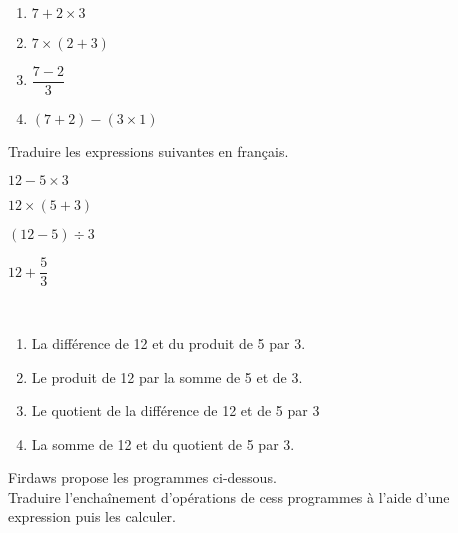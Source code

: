 \documentclass[nocrop]{sesamanuel_college_5e_new}
\begin{document}
\begin{colonne*exercice}
\begin{corrige}
   \ \\ [-5mm]
   \begin{enumerate}
      \item \blue $7+2\times3$
      \item \blue $7\times(2+3)$ \smallskip
      \item \blue $\dfrac{7-2}{3}$ \medskip
      \item \blue $(7+2)-(3\times1)$
   \end{enumerate}
\end{corrige}

\bigskip


\begin{exercice}%
   Traduire les expressions suivantes en français.
   \begin{colenumerate}{2}
      \item $12-5\times3$
      \item $12\times(5+3)$
      \item $(12-5)\div3$
      \item $12+\dfrac{5}{3}$
   \end{colenumerate}
\end{exercice}

\begin{corrige}
   \ \\ [-5mm]
   \begin{enumerate}
      \item \blue La différence de 12 et du produit de 5 par 3.
      \item \blue Le produit de 12 par la somme de 5 et de 3.
      \item \blue Le quotient de la différence de 12 et de 5 par 3
      \item \blue La somme de 12 et du quotient de 5 par 3.
   \end{enumerate}
\end{corrige}

\bigskip


\begin{exercice}%
   Firdaws propose les programmes ci-dessous. \\
   Traduire l'enchaînement d'opérations de cess programmes à l'aide d'une expression puis les calculer.
   \begin{multicols}{2}
   \end{multicols}
\end{exercice}


\end{colonne*exercice}
\end{document}
